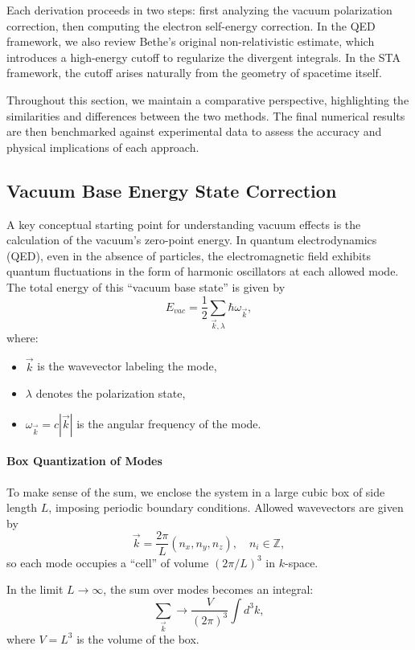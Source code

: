 \documentclass[12pt]{article}
\begin{document}
Each derivation proceeds in two steps: first analyzing the vacuum polarization correction, then computing the electron self-energy correction. In the QED framework, we also review Bethe's original non-relativistic estimate, which introduces a high-energy cutoff to regularize the divergent integrals. In the STA framework, the cutoff arises naturally from the geometry of spacetime itself.

Throughout this section, we maintain a comparative perspective, highlighting the similarities and differences between the two methods. The final numerical results are then benchmarked against experimental data to assess the accuracy and physical implications of each approach.

\subsection{Vacuum Base Energy State Correction}\label{subsec:vacuum_energy_correction}

A key conceptual starting point for understanding vacuum effects is the calculation of the vacuum’s zero-point energy. In quantum electrodynamics (QED), even in the absence of particles, the electromagnetic field exhibits quantum fluctuations in the form of harmonic oscillators at each allowed mode. The total energy of this “vacuum base state” is given by
\[
E_{vac} = \frac{1}{2}\sum_{\vec{k},\lambda} \hbar\omega_{\vec{k}},
\]
where:
\begin{itemize}
    \item \(\vec{k}\) is the wavevector labeling the mode,
    \item \(\lambda\) denotes the polarization state,
    \item \(\omega_{\vec{k}} = c|\vec{k}|\) is the angular frequency of the mode.
\end{itemize}

\paragraph{Box Quantization of Modes}
To make sense of the sum, we enclose the system in a large cubic box of side length \(L\), imposing periodic boundary conditions. Allowed wavevectors are given by
\[
\vec{k} = \frac{2\pi}{L}(n_x, n_y, n_z), \quad n_i \in \mathbb{Z},
\]
so each mode occupies a “cell” of volume \((2\pi/L)^3\) in \(k\)-space.

In the limit \(L \to \infty\), the sum over modes becomes an integral:
\[
\sum_{\vec{k}} \to \frac{V}{(2\pi)^3}\int d^3k,
\]
where \(V=L^3\) is the volume of the box.
\end{document}
